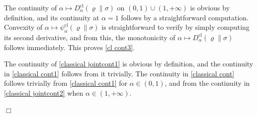 \documentclass[unsortedaddress,superscriptaddress,pra,notitlepage]{revtex4}
\newenvironment{proof}[1][Proof]{\begin{trivlist}
\item[\hskip \labelsep {\bfseries #1}]}{\hfill$\Box$\end{trivlist}}
\def\rho{\varrho}
\def\cl{\mathrm{cl}}
\def\cl{\mathrm{cl}}
\begin{document}
\begin{proof}
The continuity of $\alpha\mapsto D_{\alpha}^{\cl}(\rho\|\sigma)$ on $(0,1)\cup(1,+\infty)$ is obvious by definition, and its continuity at $\alpha=1$ follows by a 
straightforward computation.
Convexity of $\alpha\mapsto\psi_{\alpha}^{\cl}(\rho\|\sigma)$ is straightforward to verify by simply computing its second derivative, and from this, the monotonicity of $\alpha\mapsto D_{\alpha}^{\cl}(\rho\|\sigma)$ follows immediately.
This proves \ref{cl cont3}.

The continuity of \eqref{classical jointcont1} is obvious by definition, and the continuity in \eqref{classical cont1}
follows from it trivially. 
The continuity in \eqref{classical cont} follows trivially from 
\eqref{classical cont1} for $\alpha\in(0,1)$, and from 
the continuity in \eqref{classical jointcont2} when $\alpha\in(1,+\infty)$. 


\end{proof}
\end{document}
